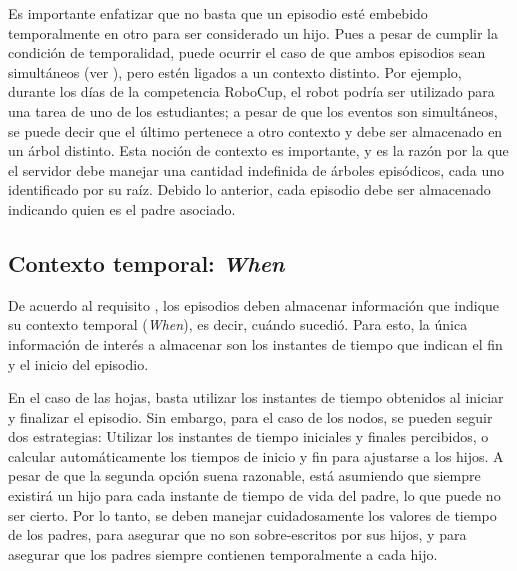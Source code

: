 Es importante enfatizar que no basta que un episodio esté embebido temporalmente en otro para ser considerado un hijo. Pues a pesar de cumplir la condición de temporalidad, puede ocurrir el caso de que ambos episodios sean simultáneos (ver ), pero estén ligados a un contexto distinto. Por ejemplo, durante los días de la competencia RoboCup, el robot podría ser utilizado para una tarea de uno de los estudiantes; a pesar de que los eventos son simultáneos, se puede decir que el último pertenece a otro contexto y debe ser almacenado en un árbol distinto. Esta noción de contexto es importante, y es la razón por la que el servidor debe manejar una cantidad indefinida de árboles episódicos, cada uno identificado por su raíz. Debido lo anterior, cada episodio debe ser almacenado indicando quien es el padre asociado.



\subsection{Contexto temporal: \textit{When}}\label{sec:design_ep_when}

De acuerdo al requisito , los episodios deben almacenar información que indique su contexto temporal (\textit{When}), es decir, cuándo  sucedió. Para esto, la única información de interés a almacenar son los instantes de tiempo que indican el fin y el inicio del episodio.

En el caso de las hojas, basta utilizar los instantes de tiempo obtenidos al iniciar y finalizar el episodio. Sin embargo, para el caso de los nodos, se pueden seguir dos estrategias: Utilizar los instantes de tiempo iniciales y finales percibidos, o calcular automáticamente los tiempos de inicio y fin para ajustarse a los hijos. A pesar de que la segunda opción suena razonable, está asumiendo que siempre existirá un hijo para cada instante de tiempo de vida del padre, lo que puede no ser cierto. Por lo tanto, se deben manejar cuidadosamente los valores de tiempo de los padres, para asegurar que no son sobre-escritos por sus hijos, y para asegurar que los padres siempre contienen temporalmente a cada hijo.


